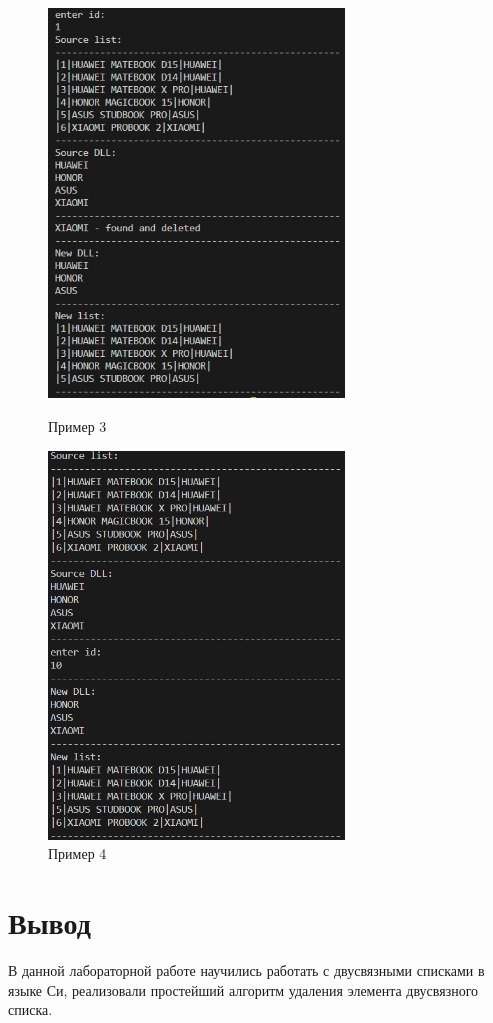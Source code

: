 \documentclass[a4paper,12pt]{report}
\begin{document}
\begin{figure}[ph]
\includegraphics[width=0.7\textwidth]{ex3.jpg}
\caption{Пример 3}
\includegraphics[width=0.7\textwidth]{ex4.jpg}
\caption{Пример 4}
\label{ris:image3}

\end{figure}


\newpage

\section*{Вывод}
В данной лабораторной работе научились работать с двусвязными списками в языке Си, 
реализовали простейший алгоритм удаления элемента двусвязного списка.
\end{document}
